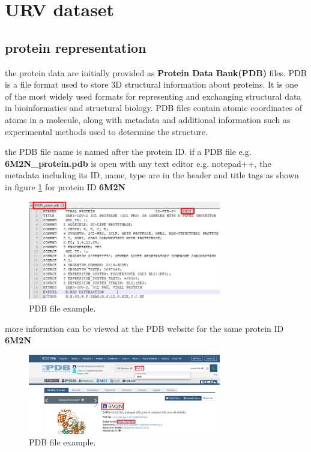 \documentclass[11pt, a4paper]{article}
\begin{document}
\section{URV dataset}
    \subsection{protein representation}
    the protein data are initially provided as \textbf{Protein Data Bank(PDB)} files. PDB is a file format used to store 3D structural information about proteins. It is one of the most widely used formats for representing and exchanging structural data in bioinformatics and structural biology.
    PDB files contain atomic coordinates of atoms in a molecule, along with metadata and additional information such as experimental methods used to determine the structure.

    the PDB file name is named after the protein ID. if a PDB file e.g. \textbf{6M2N\_protein.pdb}  is open with any text editor e.g. notepad++, the metadata including its ID, name, type
    are in the header and title tags as shown in figure \ref{fig 2} for protein ID \textbf{6M2N} 

        \begin{figure}[h]
            \centering
            \includegraphics[width=0.75\textwidth]{pdb file.png} %
            \caption{PDB file example.}
            \label{fig 2}
        \end{figure}

    more informtion can be viewed at the PDB website \cite{4} for the same protein ID \textbf{6M2N}
        \begin{figure}[h]
            \centering
            \includegraphics[width=0.75\textwidth]{pdb website.PNG} %
            \caption{PDB file example.}
            \label{fig 3}
        \end{figure}
\end{document}
